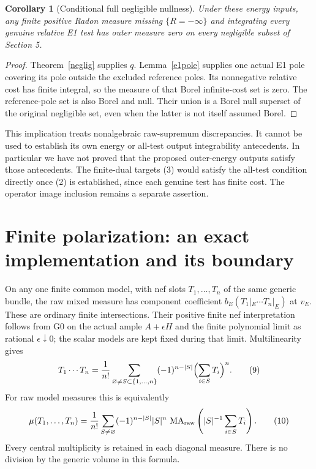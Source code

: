 \documentclass[10pt]{article}
\newtheorem{corollary}[theorem]{Corollary}
\newcommand{\MA}{\operatorname{MA}}
\begin{document}
\begin{corollary}[Conditional full negligible nullness]\label{null}
Under these energy inputs, any finite positive Radon measure missing
$\{R=-\infty\}$ and integrating every genuine relative E1 test
has outer measure zero on every negligible subset of Section 5.
\end{corollary}
\begin{proof}
Theorem~\ref{neglig} supplies $q$. Lemma~\ref{e1pole} supplies one
actual E1 pole covering its pole outside the excluded reference poles.
Its nonnegative relative cost has finite integral, so the measure of
that Borel infinite-cost set is zero. The reference-pole set is also
Borel and null. Their union is a Borel null superset of the original
negligible set, even when the latter is not itself assumed Borel.
\end{proof}

This implication treats nonalgebraic raw-supremum discrepancies.
It cannot be used to establish its own energy or all-test output
integrability antecedents. In particular we have not proved that
the proposed outer-energy outputs satisfy those antecedents.
The finite-dual targets (3) would satisfy the all-test condition
directly once (2) is established, since each genuine test has finite
cost. The operator image inclusion remains a separate assertion.

\section{Finite polarization: an exact implementation and its boundary}
On any one finite common model, with nef slots $T_1,\ldots,T_n$
of the same generic bundle, the raw mixed measure has component
coefficient $b_E(T_1|_E\cdots T_n|_E)$ at $v_E$. These are ordinary
finite intersections. Their positive finite nef interpretation follows
from G0 on the actual ample $A+\epsilon H$ and the finite polynomial
limit as rational $\epsilon\downarrow0$; the scalar models are kept
fixed during that limit. Multilinearity gives
\[
 T_1\cdots T_n=\frac1{n!}
 \sum_{\varnothing\ne S\subset\{1,\ldots,n\}}
 (-1)^{n-|S|}\Bigl(\sum_{i\in S}T_i\Bigr)^n.             \tag{9}
\]
For raw model measures this is equivalently
\[
 \mu(T_1,\ldots,T_n)=\frac1{n!}
 \sum_{S\ne\varnothing}(-1)^{n-|S|}|S|^n\,
 \MA_{\rm raw}\left(|S|^{-1}\sum_{i\in S}T_i\right).
 \tag{10}
\]
Every central multiplicity is retained in each diagonal measure.
There is no division by the generic volume in this formula.
\end{document}
